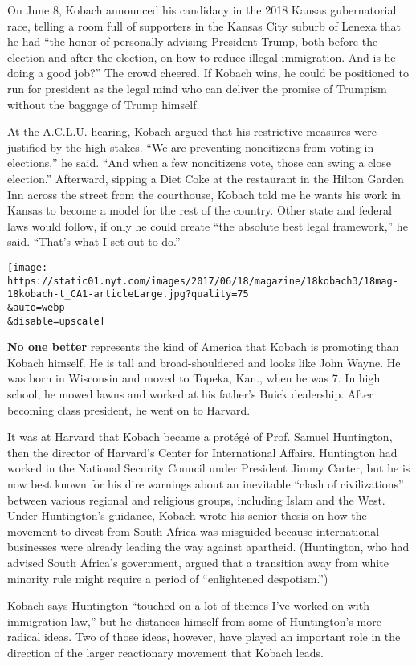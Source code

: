 On June 8, Kobach announced his candidacy in the 2018 Kansas
gubernatorial race, telling a room full of supporters in the Kansas City
suburb of Lenexa that he had ``the honor of personally advising
President Trump, both before the election and after the election, on how
to reduce illegal immigration. And is he doing a good job?'' The crowd
cheered. If Kobach wins, he could be positioned to run for president as
the legal mind who can deliver the promise of Trumpism without the
baggage of Trump himself.

At the A.C.L.U. hearing, Kobach argued that his restrictive measures
were justified by the high stakes. ``We are preventing noncitizens from
voting in elections,'' he said. ``And when a few noncitizens vote, those
can swing a close election.'' Afterward, sipping a Diet Coke at the
restaurant in the Hilton Garden Inn across the street from the
courthouse, Kobach told me he wants his work in Kansas to become a model
for the rest of the country. Other state and federal laws would follow,
if only he could create ``the absolute best legal framework,'' he said.
``That's what I set out to do.''

\texttt{[image: https://static01.nyt.com/images/2017/06/18/magazine/18kobach3/18mag-18kobach-t\_CA1-articleLarge.jpg?quality=75\\\&auto=webp\\\&disable=upscale]}

\textbf{No one better} represents the kind of America that Kobach is
promoting than Kobach himself. He is tall and broad-shouldered and looks
like John Wayne. He was born in Wisconsin and moved to Topeka, Kan.,
when he was 7. In high school, he mowed lawns and worked at his father's
Buick dealership. After becoming class president, he went on to Harvard.

It was at Harvard that Kobach became a protégé of Prof. Samuel
Huntington, then the director of Harvard's Center for International
Affairs. Huntington had worked in the National Security Council under
President Jimmy Carter, but he is now best known for his dire warnings
about an inevitable ``clash of civilizations'' between various regional
and religious groups, including Islam and the West. Under Huntington's
guidance, Kobach wrote his senior thesis on how the movement to divest
from South Africa was misguided because international businesses were
already leading the way against apartheid. (Huntington, who had advised
South Africa's government, argued that a transition away from white
minority rule might require a period of ``enlightened despotism.'')

Kobach says Huntington ``touched on a lot of themes I've worked on with
immigration law,'' but he distances himself from some of Huntington's
more radical ideas. Two of those ideas, however, have played an
important role in the direction of the larger reactionary movement that
Kobach leads.


